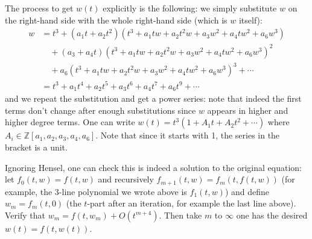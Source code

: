 \documentclass{article}
\newcommand{\Z}{\mathbb{Z}}
\theoremstyle{definition}
\begin{document}
The process to get $w(t)$ explicitly is the following: we simply substitute $w$ on the right-hand side with the whole right-hand side (which is $w$ itself):
\[
\begin{aligned}
w&=t^3+(a_1t+a_2t^2)(t^3+a_1tw+a_2t^2w+a_3w^2+a_4tw^2+a_6w^3) \\
&\quad +(a_3+a_4t)(t^3+a_1tw+a_2t^2w+a_3w^2+a_4tw^2+a_6w^3)^2\\
&\quad +a_6(t^3+a_1tw+a_2t^2w+a_3w^2+a_4tw^2+a_6w^3)^3+\cdots \\
&=t^3+a_1t^4+a_2t^5+a_3t^6+a_4t^7+a_6t^9+\cdots
\end{aligned}
\]
and we repeat the substitution and get a power series: note that indeed the first terms don't change after enough substitutions since $w$ appears in higher and higher degree terms. One can write $w(t)=t^3(1+A_1t+A_2t^2+\cdots)$ where $A_i\in\Z[a_1,a_2,a_3,a_4,a_6]$. Note that since it starts with 1, the series in the bracket is a unit.

Ignoring Hensel, one can check this is indeed a solution to the original equation: let $f_0(t,w)=f(t,w)$ and recursively $f_{m+1}(t,w)=f_m(t,f(t,w))$ (for example, the 3-line polynomial we wrote above is $f_1(t,w)$) and define $w_m=f_m(t,0)$ (the $t$-part after an iteration, for example the last line above). Verify that $w_m=f(t,w_m)+O(t^{m+4})$. Then take $m$ to $\infty$ one has the desired $w(t)=f(t,w(t))$.
\end{document}
